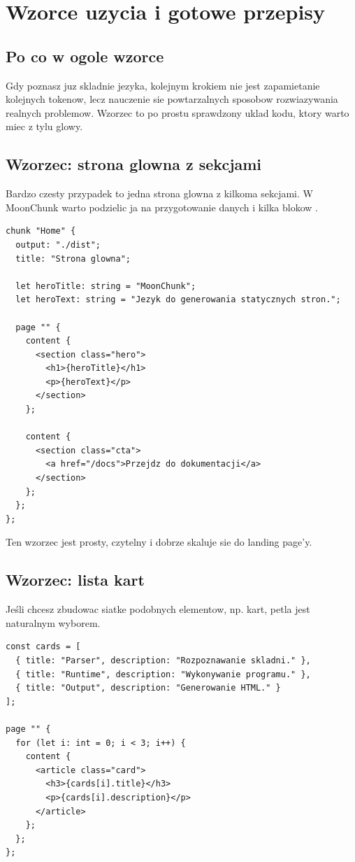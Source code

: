 \chapter{Wzorce uzycia i gotowe przepisy}

\section{Po co w ogole wzorce}
Gdy poznasz juz skladnie jezyka, kolejnym krokiem nie jest zapamietanie kolejnych tokenow,
lecz nauczenie sie powtarzalnych sposobow rozwiazywania realnych problemow. Wzorzec to
po prostu sprawdzony uklad kodu, ktory warto miec z tylu glowy.

\section{Wzorzec: strona glowna z sekcjami}
Bardzo czesty przypadek to jedna strona glowna z kilkoma sekcjami. W MoonChunk warto
podzielic ja na przygotowanie danych i kilka blokow .

\begin{lstlisting}[style=moonchunk,caption={Strona glowna skladana z sekcji}]
chunk "Home" {
  output: "./dist";
  title: "Strona glowna";

  let heroTitle: string = "MoonChunk";
  let heroText: string = "Jezyk do generowania statycznych stron.";

  page "" {
    content {
      <section class="hero">
        <h1>{heroTitle}</h1>
        <p>{heroText}</p>
      </section>
    };

    content {
      <section class="cta">
        <a href="/docs">Przejdz do dokumentacji</a>
      </section>
    };
  };
};
\end{lstlisting}

Ten wzorzec jest prosty, czytelny i dobrze skaluje sie do landing page'y.

\section{Wzorzec: lista kart}
Jeśli chcesz zbudowac siatke podobnych elementow, np. kart, petla jest naturalnym wyborem.

\begin{lstlisting}[style=moonchunk,caption={Lista kart budowana z tablicy obiektow}]
const cards = [
  { title: "Parser", description: "Rozpoznawanie skladni." },
  { title: "Runtime", description: "Wykonywanie programu." },
  { title: "Output", description: "Generowanie HTML." }
];

page "" {
  for (let i: int = 0; i < 3; i++) {
    content {
      <article class="card">
        <h3>{cards[i].title}</h3>
        <p>{cards[i].description}</p>
      </article>
    };
  };
};
\end{lstlisting}


